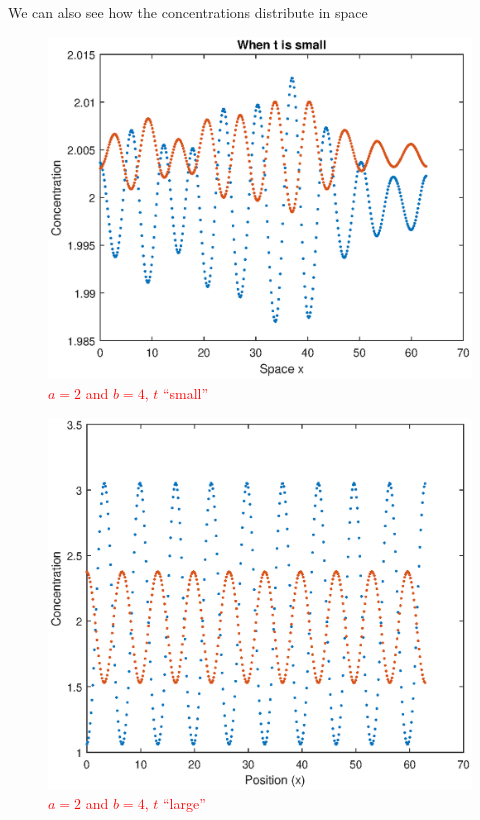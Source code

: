 \documentclass{book}
\theoremstyle{definition}
\begin{document}
We can also see how the concentrations distribute in space 
\begin{figure}[!htb]
	\centering
	\includegraphics[scale=0.6]{Turing_patterns/Turing_4bis.eps}
	\caption{\textcolor{red}{$a = 2$ and $b=4$, $t$ ``small''}}
	\label{Fig:20a}
\end{figure}
\begin{figure}[!htb]
	\centering
	\includegraphics[scale=0.6]{Turing_patterns/Turing_4.eps}
	\caption{\textcolor{red}{$a = 2$ and $b=4$, $t$ ``large''}}
	\label{Fig:20}
\end{figure}
\end{document}
